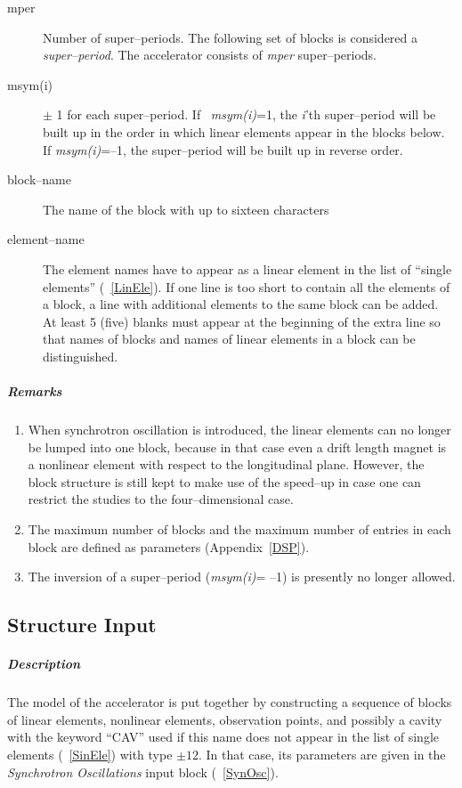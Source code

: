 \begin{description}
\item [mper] Number of super--periods. The following set of blocks is
  considered a {\em super--period}\/. The accelerator consists of {\em
    mper} \/super--periods.
\item [msym(i)] $\pm$ 1 for each super--period.  If \mbox{{\em
      msym(i)}=1,} \/the \mbox{{\em i}\/'th} super--period will be
  built up in the order in which linear elements appear in the blocks
  below. If {\em msym(i)}\/=--1, the super--period will be built up in
  reverse order.
\item [block--name] The name of the block with up to sixteen
  characters
\item [element--name] The element names have to appear as a linear
  element in the list of ``single elements'' (~\ref{LinEle}). If one
  line is too short to contain all the elements of a block, a line
  with additional elements to the same block can be added.  At least 5
  (five) blanks must appear at the beginning of the extra line so that
  names of blocks and names of linear elements in a block can be
  distinguished.
\end{description}

\subparagraph{Remarks}
\begin{enumerate}
\item When synchrotron oscillation is introduced, the linear elements
  can no longer be lumped into one block, because in that case even a
  drift length magnet is a nonlinear element with respect to the
  longitudinal plane. However, the block structure is still kept to
  make use of the speed--up in case one can restrict the studies to
  the four--dimensional case.
\item The maximum number of blocks and the maximum number of entries
  in each block are defined as parameters (Appendix~\ref{DSP}).
\item The inversion of a super--period ({\em msym(i)}\/= --1) is
  presently no longer allowed.
\end{enumerate}

\subsection{Structure Input} \label{StrInp}

\subparagraph{Description} The model of the accelerator is put
together by constructing a sequence of blocks of linear elements,
nonlinear elements, observation points, and possibly a cavity with the
keyword ``CAV'' used if this name does not appear in the list of
single elements (~\ref{SinEle}) with type $\pm 12$. In that case, its
parameters are given in the {\em Synchrotron Oscillations} \/input
block (~\ref{SynOsc}).

